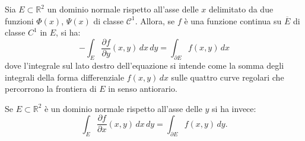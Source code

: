\documentclass[italian,a4paper]{scrartcl}
\newcommand{\RR}{{\mathbb R}}
\begin{document}
\begin{theorem}
Sia $E\subset \RR^2$ un dominio normale rispetto all'asse delle $x$
delimitato da due funzioni $\Phi(x)$, $\Psi(x)$ di classe $\mathcal C^1$. 
Allora, se $f$ è una funzione continua su $\overline E$ di classe $C^1$
in $E$, si ha:
\[
  -\int_E \frac{\partial f}{\partial y}(x,y)\, dx\, dy = \int_{\partial E} f(x,y)\, dx
\]
dove l'integrale sul lato destro dell'equazione si intende come la somma degli
integrali della forma differenziale $f(x,y)\, dx$ sulle quattro curve regolari che percorrono la frontiera di
$E$ in senso antiorario.

Se $E\subset \RR^2$ è un dominio normale rispetto all'asse delle $y$
si ha invece:
\[
  \int_E \frac{\partial f }{\partial x}(x,y)\, dx\, dy =
  \int_{\partial E} f(x,y)\, dy.
\]
\end{theorem}
\end{document}
